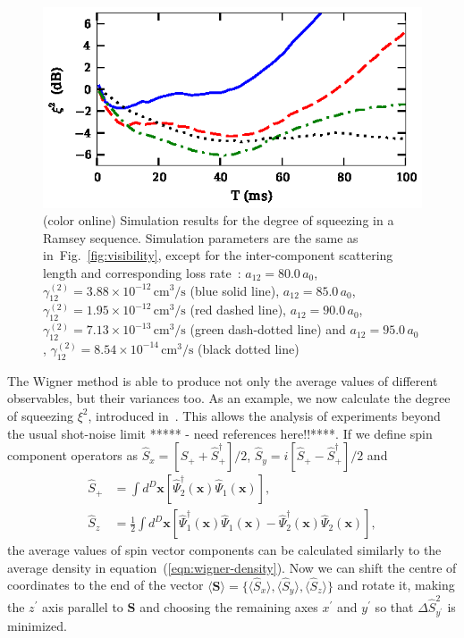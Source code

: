 \documentclass[aps,prl,twocolumn,showpacs,amsmath,amssymb,superscriptaddress,flushbottom,noraggedfooter]{revtex4-1}
\newcommand{\figref}[1]{Fig.~\ref{#1}}
\newcommand{\xvec}{\boldsymbol{x}}
\begin{document}
\begin{figure}
	\includegraphics{ramsey_squeezing.eps}

	\caption[]{(color online) Simulation results for the degree of squeezing in a Ramsey sequence.
	Simulation parameters are the same as in~\figref{fig:visibility},
	except for the inter-component scattering length and corresponding loss rate~\cite{Kaufman2009}:
	$a_{12} = 80.0\,a_0$, $\gamma^{(2)}_{12} = 3.88 \times 10^{-12}\,\mathrm{cm^3/s}$ (blue solid line),
	$a_{12} = 85.0\,a_0$, $\gamma^{(2)}_{12} = 1.95 \times 10^{-12}\,\mathrm{cm^3/s}$ (red dashed line),
	$a_{12} = 90.0\,a_0$, $\gamma^{(2)}_{12} = 7.13 \times 10^{-13}\,\mathrm{cm^3/s}$ (green dash-dotted line) and
	$a_{12} = 95.0\,a_0$, $\gamma^{(2)}_{12} = 8.54 \times 10^{-14}\,\mathrm{cm^3/s}$ (black dotted line)}

	\label{fig:squeezing}
\end{figure}

The Wigner method is able to produce not only the average values of different observables,
but their variances too.
As an example, we now calculate the degree of squeezing $\xi^2$, introduced in~\cite{Wineland1994,Sorensen2001}.
This allows the analysis of experiments beyond the usual shot-noise limit ***** - need references here!!****.
If we define spin component operators as
$\hat{S}_{x} = [ \hat{S}_+ + \hat{S}_+^\dagger ] / 2 $,
$\hat{S}_{y} = i [ \hat{S}_+ - \hat{S}_+^\dagger ] / 2 $ and
\begin{equation}
\begin{split}
	\hat{S}_+ & = \int d^D\xvec \left[
		\widehat{\Psi}^\dagger_2 (\xvec) \widehat{\Psi}_1 (\xvec)
	\right], \\
	\hat{S}_z & = \frac{1}{2} \int d^D\xvec \left[
		\widehat{\Psi}^\dagger_1 (\xvec) \widehat{\Psi}_1 (\xvec)
		- \widehat{\Psi}^\dagger_2 (\xvec) \widehat{\Psi}_2 (\xvec)
	\right],
\end{split}
\end{equation}
the average values of spin vector components can be calculated similarly to the average density in
equation~(\ref{eqn:wigner-density}).
Now we can shift the centre of coordinates to the end of the vector
$\langle \boldsymbol{S} \rangle = \{ \langle \hat{S}_x \rangle, \langle \hat{S}_y \rangle, \langle \hat{S}_z \rangle \}$
and rotate it, making the $z^\prime$ axis parallel to $\boldsymbol{S}$ and choosing the remaining axes $x^\prime$ and $y^\prime$ so that
$\Delta \hat{S}^2_{y^\prime} $ is minimized.
\end{document}
